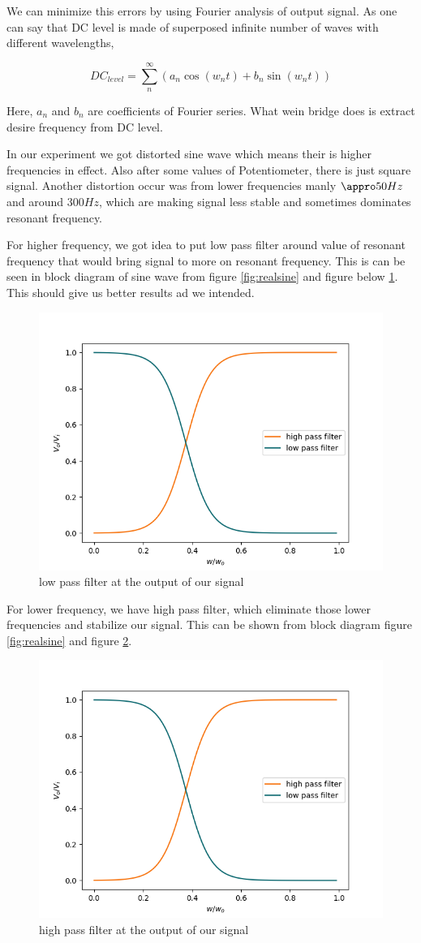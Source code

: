 \documentclass[14pt,a4paper]{extarticle}
\begin{document}
We can minimize this errors by using Fourier analysis of output signal. As one can say that DC level is made of superposed infinite number of waves with different wavelengths,

\begin{equation*}
DC_{level}= \sum_{n}^{\infty}(a_n\cos(w_nt)+b_n\sin(w_nt))
\end{equation*}

Here, \(a_n\) and \(b_n\) are coefficients of Fourier series. What wein bridge does is extract desire frequency from DC level. 


In our experiment we got distorted sine wave which means their is higher frequencies in effect. Also after some values of Potentiometer, there is just square signal. Another distortion occur was from lower frequencies manly \(\appro 50Hz\) and around \(300Hz\), which are making signal less stable and sometimes dominates resonant frequency. 


For higher frequency, we got idea to put low pass filter around value of resonant frequency that would bring signal to more on resonant frequency. This is can be seen in block diagram of sine wave from figure \ref{fig:realsine} and figure below \ref{fig:lowpass}. This should give us better results ad we intended.


\begin{figure}[h]
\centering
\includegraphics[width=0.5\linewidth]{imgs/highlow.png}
\caption{low pass filter at the output of our signal}
\label{fig:lowpass}
\end{figure}


For lower frequency, we have high pass filter, which eliminate those lower frequencies and stabilize our signal. This can be shown from block diagram figure \ref{fig:realsine} and figure \ref{fig:highpass}.


\begin{figure}[h]
\centering
\includegraphics[width=0.5\linewidth]{imgs/highlow.png}
\caption{high pass filter at the output of our signal}
\label{fig:highpass}
\end{figure}
\end{document}

